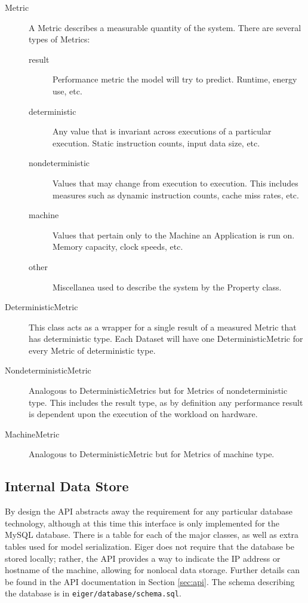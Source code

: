 \begin{description}
\item[Metric] A Metric describes a measurable quantity of the system. 
There are several types of Metrics:
	\begin{description}
	\item[result] Performance metric the model will try to predict.  Runtime,
		energy use, etc.
	\item[deterministic] Any value that is invariant across executions of a
		particular execution. Static instruction counts, input 
		data size, etc.
	\item[nondeterministic] Values that may change from execution to execution.
		This includes measures such as dynamic instruction counts, cache miss
		rates, etc.
	\item[machine] Values that pertain only to the Machine an Application is run
		on. Memory capacity, clock speeds, etc.
	\item[other] Miscellanea used to describe the system by the Property class.
	\end{description}

\item[DeterministicMetric] This class acts as a wrapper for a single result of a
measured Metric that has deterministic type. Each Dataset will have one
DeterministicMetric for every Metric of deterministic type.

\item[NondeterministicMetric] Analogous to DeterministicMetrics but for Metrics
of nondeterministic type. This includes the result type, as by definition
any performance result is dependent upon the execution of the workload on
hardware.

\item[MachineMetric] Analogous to DeterministicMetric but for Metrics of machine
type. 
\end{description}

\subsection{Internal Data Store}
By design the API abstracts away the requirement for any particular
database technology, although at this time this interface is only
implemented for the MySQL database. There is a table for each of the major
classes, as well as extra tables used for model serialization. Eiger does
not require that the database be stored locally; rather, the API provides a
way to indicate the IP address or hostname of the machine, allowing for
nonlocal data storage.  Further details can be found in the API
documentation in Section \ref{sec:api}. The schema describing the database is in
\texttt{eiger/database/schema.sql}. 

